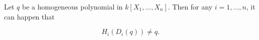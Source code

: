 Let $q$ be a homogeneous polynomial in $k[X_1, \ldots, X_n]$. Then for any $i = 1, \ldots, n$, it can happen that

$$H_i(D_i(q)) \neq q.$$
